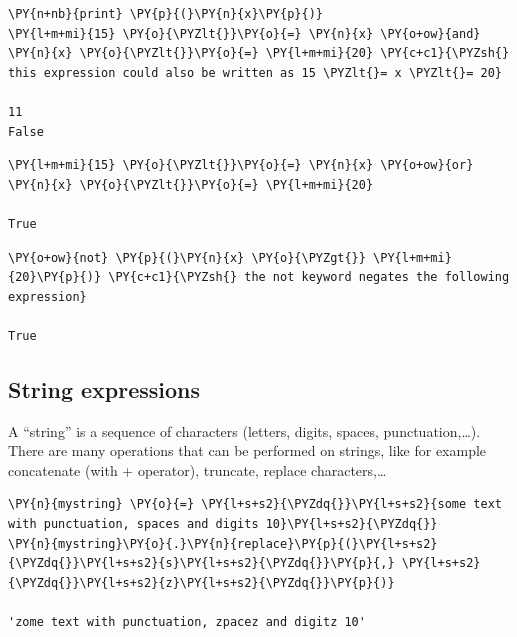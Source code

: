 \begin{tcolorbox}[breakable, size=fbox, boxrule=1pt, pad at break*=1mm, colback=cellbackground, colframe=cellborder]
\begin{Verbatim}[commandchars=\\\{\}]
\PY{n+nb}{print} \PY{p}{(}\PY{n}{x}\PY{p}{)}
\PY{l+m+mi}{15} \PY{o}{\PYZlt{}}\PY{o}{=} \PY{n}{x} \PY{o+ow}{and} \PY{n}{x} \PY{o}{\PYZlt{}}\PY{o}{=} \PY{l+m+mi}{20} \PY{c+c1}{\PYZsh{} this expression could also be written as 15 \PYZlt{}= x \PYZlt{}= 20}

11
False
\end{Verbatim}
\end{tcolorbox}

\begin{tcolorbox}[breakable, size=fbox, boxrule=1pt, pad at break*=1mm, colback=cellbackground, colframe=cellborder]            
\begin{Verbatim}[commandchars=\\\{\}]
\PY{l+m+mi}{15} \PY{o}{\PYZlt{}}\PY{o}{=} \PY{n}{x} \PY{o+ow}{or} \PY{n}{x} \PY{o}{\PYZlt{}}\PY{o}{=} \PY{l+m+mi}{20}

True
\end{Verbatim}
\end{tcolorbox}

\begin{tcolorbox}[breakable, size=fbox, boxrule=1pt, pad at break*=1mm, colback=cellbackground, colframe=cellborder]            
\begin{Verbatim}[commandchars=\\\{\}]
\PY{o+ow}{not} \PY{p}{(}\PY{n}{x} \PY{o}{\PYZgt{}} \PY{l+m+mi}{20}\PY{p}{)} \PY{c+c1}{\PYZsh{} the not keyword negates the following expression}

True
\end{Verbatim}
\end{tcolorbox}

\subsection{String expressions}\label{string-expressions}

A ``string'' is a sequence of characters (letters, digits, spaces, punctuation,\ldots). There are many operations that can be performed on strings, like for example concatenate (with + operator), truncate, replace characters,\ldots

\begin{tcolorbox}[breakable, size=fbox, boxrule=1pt, pad at break*=1mm, colback=cellbackground, colframe=cellborder]            
\begin{Verbatim}[commandchars=\\\{\}]
\PY{n}{mystring} \PY{o}{=} \PY{l+s+s2}{\PYZdq{}}\PY{l+s+s2}{some text with punctuation, spaces and digits 10}\PY{l+s+s2}{\PYZdq{}}
\PY{n}{mystring}\PY{o}{.}\PY{n}{replace}\PY{p}{(}\PY{l+s+s2}{\PYZdq{}}\PY{l+s+s2}{s}\PY{l+s+s2}{\PYZdq{}}\PY{p}{,} \PY{l+s+s2}{\PYZdq{}}\PY{l+s+s2}{z}\PY{l+s+s2}{\PYZdq{}}\PY{p}{)}

'zome text with punctuation, zpacez and digitz 10'
\end{Verbatim}
\end{tcolorbox}

